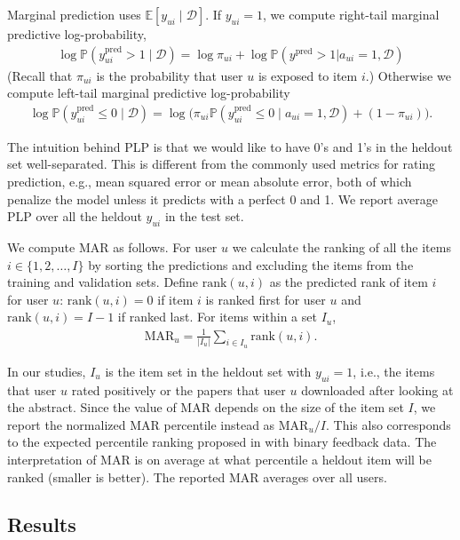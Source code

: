 Marginal prediction uses $\mathbb{E}[y_{ui} \mid \mathcal{D}]$. If
$y_{ui} = 1$, we compute right-tail marginal predictive
log-probability,
\begin{align*}
  \log \mathbb{P}(y^\text{pred}_{ui} > 1 \mid \mathcal{D}) =
  \log\pi_{ui} + \log \mathbb{P}(y^\text{pred} > 1 | a_{ui} = 1,
  \mathcal{D})
\end{align*}
(Recall that $\pi_{ui}$ is the probability that user $u$ is exposed to
item $i$.) Otherwise we compute left-tail marginal predictive
log-probability
  \begin{align*}
    \log \mathbb{P}(y^\text{pred}_{ui} \leq 0 \mid \mathcal{D}) =
    \log\big(\pi_{ui} \mathbb{P}(y^\text{pred}_{ui} \leq 0 \mid a_{ui} =
    1, \mathcal{D}) + (1 - \pi_{ui})\big).
  \end{align*}

The intuition behind PLP is that we would like to have 0's and 1's in
the heldout set well-separated. This is different from the
commonly used metrics for rating prediction, e.g., mean squared error
or mean absolute error, both of which penalize the model unless it
predicts with a perfect 0 and 1. We report average PLP over all the
heldout $y_{ui}$ in the test set.


 We compute MAR as follows. For user $u$
we calculate the ranking of all the items $i\in \{1, 2, \dots, I\}$ by
sorting the predictions and excluding the items from the training and
validation sets. Define $\text{rank}(u, i)$ as the predicted rank of
item $i$ for user $u$: $\text{rank}(u, i)=0$ if item $i$ is ranked
first for user $u$ and $\text{rank}(u, i) = I-1$ if ranked last. For
items within a set $I_u$, \begin{align*}
  \text{MAR}_u = \frac{1}{|I_u|}\sum_{i\in I_u} \text{rank}(u, i).
\end{align*}

In our studies, $I_u$ is the item set in the heldout set with
$y_{ui} = 1$, i.e., the items that user $u$ rated positively or the
papers that user $u$ downloaded after looking at the abstract. Since
the value of MAR depends on the size of the item set $I$, we report
the normalized MAR percentile instead as $\text{MAR}_u / I$. This also
corresponds to the expected percentile ranking proposed in
\citet{hu2008collaborative} with binary feedback data. The
interpretation of MAR is on average at what percentile a heldout item
will be ranked (smaller is better). The reported MAR averages over all
users.

\subsection{Results}

